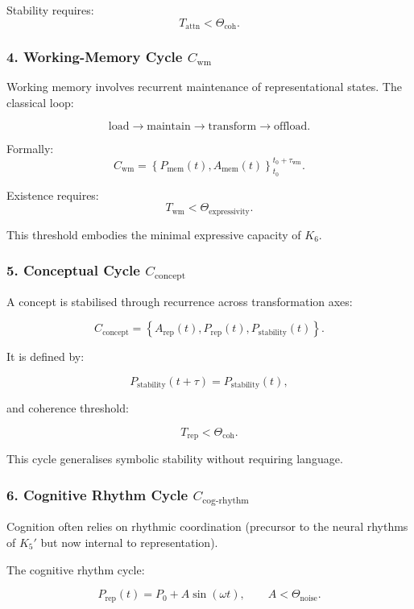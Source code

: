 Stability requires:
\[
  T_{\mathrm{attn}} < \Theta_{\mathrm{coh}}.
\]

\subsubsection{4. Working-Memory Cycle $C_{\mathrm{wm}}$}

Working memory involves recurrent maintenance of representational states.
The classical loop:

\[
 \mathrm{load}
 \to
 \mathrm{maintain}
 \to
 \mathrm{transform}
 \to
 \mathrm{offload}.
\]

Formally:
\[
 C_{\mathrm{wm}} = 
 \left\{
   P_{\mathrm{mem}}(t), A_{\mathrm{mem}}(t)
 \right\}_{t_0}^{t_0+\tau_{\mathrm{wm}}}.
\]

Existence requires:
\[
 T_{\mathrm{wm}} < \Theta_{\mathrm{expressivity}}.
\]

This threshold embodies the minimal expressive capacity of $K_6$.

\subsubsection{5. Conceptual Cycle $C_{\mathrm{concept}}$}

A concept is stabilised through recurrence across transformation axes:

\[
  C_{\mathrm{concept}}
    = \left\{
      A_{\mathrm{rep}}(t),
      P_{\mathrm{rep}}(t),
      P_{\mathrm{stability}}(t)
    \right\}.
\]

It is defined by:

\[
  P_{\mathrm{stability}}(t+\tau) = P_{\mathrm{stability}}(t),
\]

and coherence threshold:

\[
  T_{\mathrm{rep}} < \Theta_{\mathrm{coh}}.
\]

This cycle generalises symbolic stability without requiring language.

\subsubsection{6. Cognitive Rhythm Cycle $C_{\mathrm{cog\text{-}rhythm}}$}

Cognition often relies on rhythmic coordination (precursor to the
neural rhythms of $K_5'$ but now internal to representation).

The cognitive rhythm cycle:

\[
 P_{\mathrm{rep}}(t) = P_0 + A\sin(\omega t),\qquad
 A < \Theta_{\mathrm{noise}}.
\]

